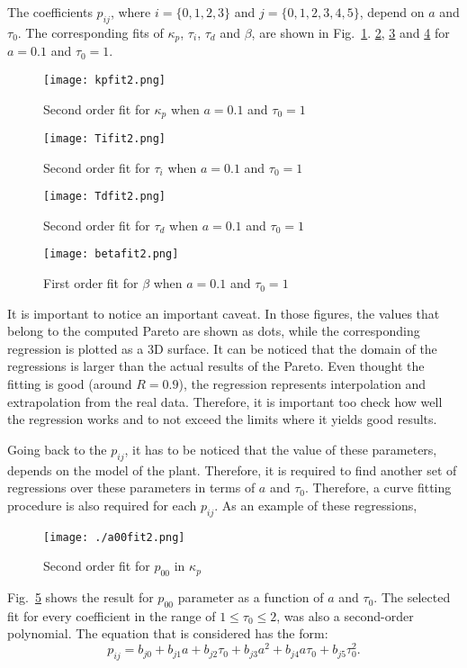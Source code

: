 The coefficients $p_{ij}$, where $i=\{0,1,2,3\}$ and $j=\{0,1,2,3,4,5\}$, depend on $a$ and $\tau_0$. The corresponding fits of $\kappa_p$, $\tau_i$, $\tau_d$ and $\beta$, are shown in Fig.~\ref{F:cftoolkp}. \ref{F:cftoolTi}, \ref{F:cftoolTd} and \ref{F:cftoolbeta} for $a=0.1$ and $\tau_{0}=1$.   %
%
\begin{figure}[tb]
	\centering
	\texttt{[image: kpfit2.png]}
	\caption{Second order fit for $\kappa_p$ when $a=0.1$ and $\tau_{0}=1$}
	\label{F:cftoolkp}
\end{figure}
%
\begin{figure}[tb]
	\centering
	\texttt{[image: Tifit2.png]}
	\caption{Second order fit for $\tau_i$ when $a=0.1$ and $\tau_0=1$}
	\label{F:cftoolTi}
\end{figure}
%
\begin{figure}[tb]
	\centering
	\texttt{[image: Tdfit2.png]}
	\caption{Second order fit for $\tau_d$ when $a=0.1$ and $\tau_0=1$}
	\label{F:cftoolTd}
\end{figure}
%
\begin{figure}[tb]
	\centering
	\texttt{[image: betafit2.png]}
	\caption{First order fit for $\beta$ when $a=0.1$ and $\tau_0=1$}
	\label{F:cftoolbeta}
\end{figure}

It is important to notice an important caveat. In those figures, the values that belong to the computed Pareto are shown as dots, while the corresponding regression is plotted as a 3D surface. It can be noticed that the domain of the regressions is larger than the actual results of the Pareto. Even thought the fitting is good (around $R=0.9$), the regression represents interpolation and extrapolation from the real data. Therefore, it is important too check how well the regression works and to not exceed the limits where it yields good results.

Going back to the $p_{ij}$, it has to be noticed that the value of these parameters, depends on the model of the plant. Therefore, it is required to find another set of regressions over these parameters in terms of $a$ and $\tau_0$. Therefore, a curve fitting procedure is also required for each $p_{ij}$. As an example of these regressions, 
%
\begin{figure}[tb]
	\centering
	\texttt{[image: ./a00fit2.png]}
	\caption{Second order fit for $p_{00}$ in $\kappa_p$}
	\label{F:coeff}
\end{figure}
%
Fig.~\ref{F:coeff} shows the result for $p_{00}$ parameter as a function of $a$ and $\tau_0$. The selected fit for every coefficient in the range of $1\leq \tau_0 \leq2$, was also a second-order polynomial. The equation that is considered has the form:
%
\begin{equation}
p_{ij} = b_{j0}+b_{j1}a+b_{j2} \tau_0+b_{j3}a^2+b_{j4}a \tau_0+b_{j5}\tau_0^2 .
\label{E:coeff}
\end{equation}

